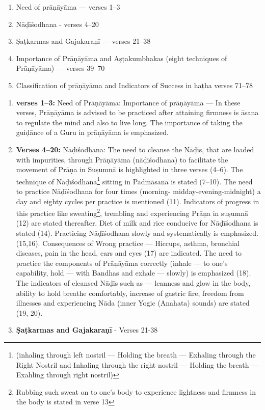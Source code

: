 \begin{enumerate}
\item Need  of prāṇāyāma ---  verses 1--3 
\item Nāḍīśodhana  - verses 4--20
\item Ṣaṭkarmas and Gajakaraṇī --- verses 21--38
\item Importance of Prāṇāyāma and Aṣṭakumbhakas (eight techniques of Prāṇāyāma) --- verses 39--70
\item Classification of prāṇāyāma and  Indicators of  Success in haṭha verses 71--78
\end{enumerate}

\begin{enumerate}
\item \textbf{verses 1--3:} Need of Prāṇāyāma: Importance of prāṇāyāma  --- In these verses, Prāṇāyāma is advised  to be practiced after attaining  firmness is āsana to regulate the mind  and also to live long. The importance of taking the guiḍānce of a Guru in  prāṇāyāma is emphasized.  

\item \textbf{Verses 4--20:} Nāḍīśodhana: The need to cleanse the Nāḍīs, that are loaded with impurities, through Prāṇāyāma (nāḍīśodhana) to facilitate the movement of Prāṇa in Suṣumnā is highlighted in three verses (4--6). The technique of Nāḍīśodhana\footnote{(inhaling through left nostril --- Holding the breath --- Exhaling through the Right Nostril and Inhaling through the right nostril --- Holding the breath --- Exahling through right nostril)} sitting in Padmāsana is stated (7--10). The need to practice Nāḍīśodhana for four times (morning- midday-evening-midnight) a day and eighty cycles per practice is mentioned (11). Indicators of progress in this practice like sweating\footnote{Rubbing such sweat on to one’s body to experience lightness and firmness in the body is stated in verse 13}, trembling and experiencing Prāṇa in suṣumnā (12) are stated thereafter. Diet of milk and rice conducive for Nāḍīśodhana is stated (14). Practicing Nāḍīśodhana slowly and systematically is emphasized. (15,16).  Consequences of Wrong practice --- Hiccups, asthma, bronchial diseases, pain in the head, ears and eyes (17) are indicated. The need to practice the components of Prāṇāyāma correctly (inhale --- to one’s capability, hold --- with Bandhas  and exhale --- slowly) is emphasized (18).  The indicators of cleansed Nāḍīs such as --- leanness and glow in the body, ability to hold breathe comfortably, increase of gastric fire, freedom from illnesses and experiencing Nāda (inner Yogic (Anahata) sounds) are stated (19, 20).
\item \textbf{Ṣaṭkarmas and Gajakaraṇī} - Verses  21-38


\end{enumerate}
